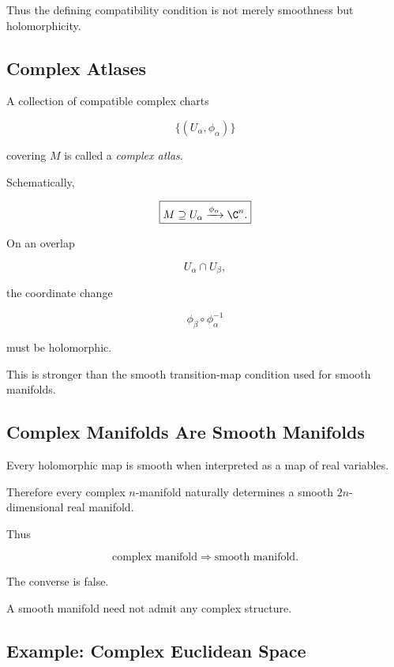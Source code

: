 Thus the defining compatibility condition is not merely smoothness but
holomorphicity.

\subsection{Complex Atlases}
\label{subsec:complex-atlases}

A collection of compatible complex charts

\[
\{(U_\alpha,\phi_\alpha)\}
\]

covering \(M\) is called a \emph{complex atlas}.

Schematically,

\[
\boxed{
M
\supseteq U_\alpha
\xrightarrow{\phi_\alpha}
\C^n.
}
\]

On an overlap

\[
U_\alpha\cap U_\beta,
\]

the coordinate change

\[
\phi_\beta\circ\phi_\alpha^{-1}
\]

must be holomorphic.

This is stronger than the smooth transition-map condition used for smooth
manifolds.

\subsection{Complex Manifolds Are Smooth Manifolds}
\label{subsec:complex-manifolds-smooth}

Every holomorphic map is smooth when interpreted as a map of real variables.

Therefore every complex \(n\)-manifold naturally determines a smooth
\(2n\)-dimensional real manifold.

Thus

\[
\boxed{
\text{complex manifold}
\Longrightarrow
\text{smooth manifold}.
}
\]

The converse is false.

A smooth manifold need not admit any complex structure.

\subsection{Example: Complex Euclidean Space}
\label{subsec:complex-euclidean-space}


